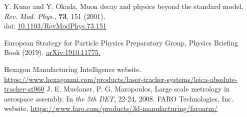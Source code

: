 \documentclass[report]{jsbook}
\begin{document}
\begin{thebibliography}{99}
 Y. Kuno and Y. Okada, Muon decay and physics beyond the standard model, {\it Rev. Mod. Phys.}, {\bf 73}, 151 (2001). \\
doi: \href{http://dx.doi.org/10.1103/RevModPhys.73.151}{10.1103/RevModPhys.73.151}

 European Strategy for Particle Physics Preparatory Group, Physics Briefing Book (2019). \href{http://arxiv.org/abs/1910.11775}{arXiv:1910.11775.} 

 Hexagon Manufacturing Intelligence website. \url{https://www.hexagonmi.com/products/laser-tracker-systems/leica-absolute-tracker-at960}
 J. E. Muelaner, P. G. Maropoulos, Large scale metrology in aerospace assembly. In {\it the 5th DET}, 22-24, 2008.
 FARO Technologies, Inc. website. \url{https://www.faro.com/products/3d-manufacturing/faroarm/}
\end{thebibliography}


\begin{comment}

・図の挿入の仕方
\begin{figure}[h]
\begin{center}
\texttt{[image: ./plot1.pdf]}
\caption{サイン関数のグラフ}
\end{center}
\end{figure}


\begin{verbatim}
#include <iostream>
using namespace std;
int main() {
for(int i = 1; i <= 5; i++) {
cout << "こんにちは" << i << endl;
}
return 0;
}
\end{verbatim}
\verb|\usepackage{ascmac}|して\verb|screen| 環境を使うと，枠がつきます。
\begin{screen}
\begin{verbatim}
#include <iostream>
using namespace std;
int main() {
for(int i = 1; i <= 5; i++) {
cout << "こんにちは" << i << endl;
}
return 0;
}
\end{verbatim}
\end{screen}

\end{comment}
\end{document}
